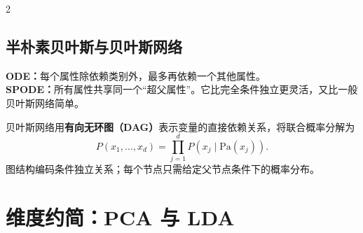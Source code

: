 \documentclass[9pt,a4paper,UTF8]{ctexart}
\begin{document}
\begin{multicols}{2}
\subsection{半朴素贝叶斯与贝叶斯网络}
\textbf{ODE：}每个属性除依赖类别外，最多再依赖一个其他属性。\\
\textbf{SPODE：}所有属性共享同一个“超父属性”。它比完全条件独立更灵活，又比一般贝叶斯网络简单。

贝叶斯网络用\textbf{有向无环图（DAG）}表示变量的直接依赖关系，将联合概率分解为
\[
P(x_1,\ldots,x_d)=\prod_{j=1}^{d}P(x_j\mid \mathrm{Pa}(x_j)).
\]
图结构编码条件独立关系；每个节点只需给定父节点条件下的概率分布。
\end{multicols}

\section{维度约简：PCA 与 LDA}
\end{document}
